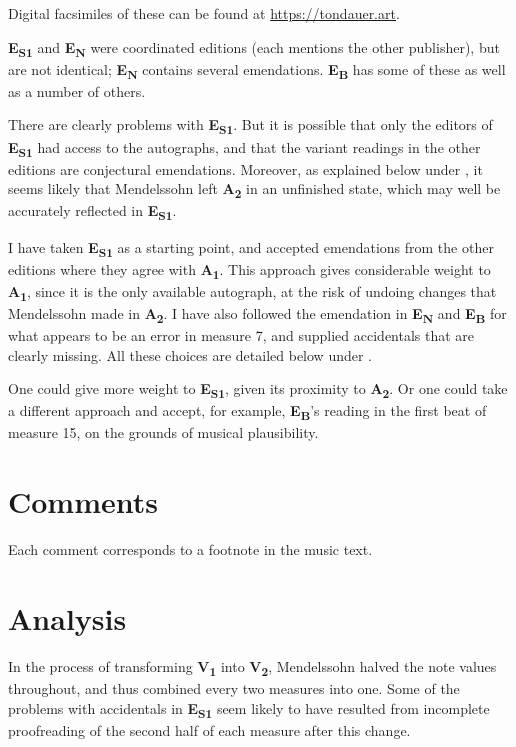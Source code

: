 \documentclass[a4paper, 12pt]{book}
\newcommand{\source}[2]{\textbf{#1\textsubscript{#2}}}
\begin{document}
{    Digital facsimiles of these can be found at \url{https://tondauer.art}.

    \source{E}{S1} and \source{E}{N} were coordinated editions (each
    mentions the other publisher), but are not identical;
    \source{E}{N} contains several emendations. \source{E}{B} has some
    of these as well as a number of others.

    There are clearly problems with \source{E}{S1}. But it is possible
    that only the editors of \source{E}{S1} had access to the
    autographs, and that the variant readings in the other editions
    are conjectural emendations. Moreover, as explained below under
    , it seems likely that Mendelssohn left
    \source{A}{2} in an unfinished state, which may well be accurately
    reflected in \source{E}{S1}.

    I have taken \source{E}{S1} as a starting point, and accepted
    emendations from the other editions where they agree with
    \source{A}{1}. This approach gives considerable weight to
    \source{A}{1}, since it is the only available autograph, at the
    risk of undoing changes that Mendelssohn made in \source{A}{2}.
    I have also followed the emendation in \source{E}{N} and
    \source{E}{B} for what appears to be an error in measure 7, and
    supplied accidentals that are clearly missing. All these choices
    are detailed below under .

    One could give more weight to \source{E}{S1}, given its proximity
    to \source{A}{2}. Or one could take a different approach and
    accept, for example, \source{E}{B}'s reading in the first beat of
    measure 15, on the grounds of musical plausibility.
    
    \section*{Comments}
    \label{sec:comments}

    Each comment corresponds to a footnote in the music text.

    

    \section*{Analysis}
    \label{sec:analysis}

    In the process of transforming \source{V}{1} into \source{V}{2},
    Mendelssohn halved the note values throughout, and thus combined
    every two measures into one. Some of the problems with accidentals
    in \source{E}{S1} seem likely to have resulted from incomplete
    proofreading of the second half of each measure after this
    change.

}
\end{document}
